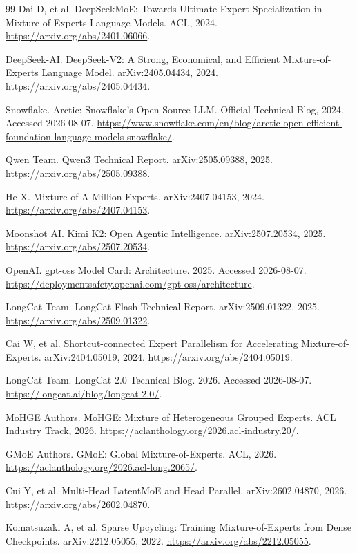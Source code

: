 \documentclass[10pt,a4paper,fontset=none]{ctexart}
\begin{document}
\begin{thebibliography}{99}
Dai D, et al. DeepSeekMoE: Towards Ultimate Expert Specialization in Mixture-of-Experts Language Models. ACL, 2024. \url{https://arxiv.org/abs/2401.06066}.

DeepSeek-AI. DeepSeek-V2: A Strong, Economical, and Efficient Mixture-of-Experts Language Model. arXiv:2405.04434, 2024. \url{https://arxiv.org/abs/2405.04434}.

Snowflake. Arctic: Snowflake's Open-Source LLM. Official Technical Blog, 2024. Accessed 2026-08-07. \url{https://www.snowflake.com/en/blog/arctic-open-efficient-foundation-language-models-snowflake/}.

Qwen Team. Qwen3 Technical Report. arXiv:2505.09388, 2025. \url{https://arxiv.org/abs/2505.09388}.

He X. Mixture of A Million Experts. arXiv:2407.04153, 2024. \url{https://arxiv.org/abs/2407.04153}.

Moonshot AI. Kimi K2: Open Agentic Intelligence. arXiv:2507.20534, 2025. \url{https://arxiv.org/abs/2507.20534}.

OpenAI. gpt-oss Model Card: Architecture. 2025. Accessed 2026-08-07. \url{https://deploymentsafety.openai.com/gpt-oss/architecture}.

LongCat Team. LongCat-Flash Technical Report. arXiv:2509.01322, 2025. \url{https://arxiv.org/abs/2509.01322}.

Cai W, et al. Shortcut-connected Expert Parallelism for Accelerating Mixture-of-Experts. arXiv:2404.05019, 2024. \url{https://arxiv.org/abs/2404.05019}.

LongCat Team. LongCat 2.0 Technical Blog. 2026. Accessed 2026-08-07. \url{https://longcat.ai/blog/longcat-2.0/}.

MoHGE Authors. MoHGE: Mixture of Heterogeneous Grouped Experts. ACL Industry Track, 2026. \url{https://aclanthology.org/2026.acl-industry.20/}.

GMoE Authors. GMoE: Global Mixture-of-Experts. ACL, 2026. \url{https://aclanthology.org/2026.acl-long.2065/}.

Cui Y, et al. Multi-Head LatentMoE and Head Parallel. arXiv:2602.04870, 2026. \url{https://arxiv.org/abs/2602.04870}.

Komatsuzaki A, et al. Sparse Upcycling: Training Mixture-of-Experts from Dense Checkpoints. arXiv:2212.05055, 2022. \url{https://arxiv.org/abs/2212.05055}.


\end{thebibliography}
\end{document}
